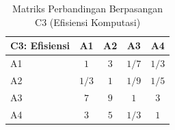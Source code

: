 \begin{table}[H]
	\centering
	\caption{Matriks Perbandingan Berpasangan C3 (Efisiensi Komputasi)}
	\label{tab:perbandingan_c3}
	\begin{tabular}{|l|c|c|c|c|}
		\hline
		C3: Efisiensi & A1 & A2 & A3 & A4 \\ \hline
		A1 & $1$ & $3$ & $1/7$ & $1/3$ \\ \hline
		A2 & $1/3$ & $1$ & $1/9$ & $1/5$ \\ \hline
		A3 & $7$ & $9$ & $1$ & $3$ \\ \hline
		A4 & $3$ & $5$ & $1/3$ & $1$ \\ \hline
	\end{tabular}
\end{table}